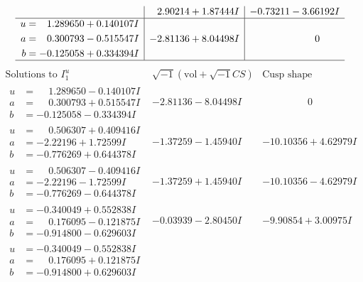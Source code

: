 \documentclass[1p]{elsarticle_modified}
\theoremstyle{definition}
\newcommand{\I}{\sqrt{-1}}
\begin{document}
$$\begin{array}{c|c|c}
 & \phantom{-}2.90214 + 1.87444 I & -0.73211 - 3.66192 I \\ \hline\begin{aligned}
u &= \phantom{-}1.289650 + 0.140107 I \\
a &= \phantom{-}0.300793 - 0.515547 I \\
b &= -0.125058 + 0.334394 I\end{aligned}
 & -2.81136 + 8.04498 I & \phantom{-0.000000 } 0\\
 \hline 
 \end{array}$$\newpage$$\begin{array}{c|c|c}  
\text{Solutions to }I^u_{1}& \I (\text{vol} + \sqrt{-1}CS) & \text{Cusp shape}\\
 \hline 
\begin{aligned}
u &= \phantom{-}1.289650 - 0.140107 I \\
a &= \phantom{-}0.300793 + 0.515547 I \\
b &= -0.125058 - 0.334394 I\end{aligned}
 & -2.81136 - 8.04498 I & \phantom{-0.000000 } 0 \\ \hline\begin{aligned}
u &= \phantom{-}0.506307 + 0.409416 I \\
a &= -2.22196 + 1.72599 I \\
b &= -0.776269 + 0.644378 I\end{aligned}
 & -1.37259 - 1.45940 I & -10.10356 + 4.62979 I \\ \hline\begin{aligned}
u &= \phantom{-}0.506307 - 0.409416 I \\
a &= -2.22196 - 1.72599 I \\
b &= -0.776269 - 0.644378 I\end{aligned}
 & -1.37259 + 1.45940 I & -10.10356 - 4.62979 I \\ \hline\begin{aligned}
u &= -0.340049 + 0.552838 I \\
a &= \phantom{-}0.176095 - 0.121875 I \\
b &= -0.914800 - 0.629603 I\end{aligned}
 & -0.03939 - 2.80450 I & -9.90854 + 3.00975 I \\ \hline\begin{aligned}
u &= -0.340049 - 0.552838 I \\
a &= \phantom{-}0.176095 + 0.121875 I \\
b &= -0.914800 + 0.629603 I\end{aligned}

\end{array}$$
\end{document}
